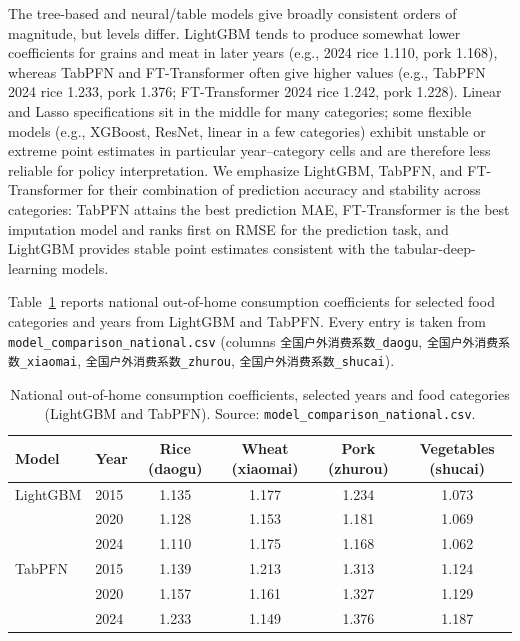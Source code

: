 The tree-based and neural/table models give broadly consistent orders of magnitude, but levels differ. LightGBM tends to produce somewhat lower coefficients for grains and meat in later years (e.g., 2024 rice 1.110, pork 1.168), whereas TabPFN and FT-Transformer often give higher values (e.g., TabPFN 2024 rice 1.233, pork 1.376; FT-Transformer 2024 rice 1.242, pork 1.228). Linear and Lasso specifications sit in the middle for many categories; some flexible models (e.g., XGBoost, ResNet, linear in a few categories) exhibit unstable or extreme point estimates in particular year--category cells and are therefore less reliable for policy interpretation. We emphasize LightGBM, TabPFN, and FT-Transformer for their combination of prediction accuracy and stability across categories: TabPFN attains the best prediction MAE, FT-Transformer is the best imputation model and ranks first on RMSE for the prediction task, and LightGBM provides stable point estimates consistent with the tabular-deep-learning models.

Table~\ref{tab:national_coef_summary} reports national out-of-home consumption coefficients for selected food categories and years from LightGBM and TabPFN. Every entry is taken from \texttt{model\_comparison\_national.csv} (columns \texttt{全国户外消费系数\_daogu}, \texttt{全国户外消费系数\_xiaomai}, \texttt{全国户外消费系数\_zhurou}, \texttt{全国户外消费系数\_shucai}).

\begin{table}[htbp]
\centering
\caption{National out-of-home consumption coefficients, selected years and food categories (LightGBM and TabPFN). Source: \texttt{model\_comparison\_national.csv}.}
\label{tab:national_coef_summary}
\begin{tabular}{llcccc}
\toprule
Model    & Year & Rice (daogu) & Wheat (xiaomai) & Pork (zhurou) & Vegetables (shucai) \\
\midrule
LightGBM & 2015 & 1.135 & 1.177 & 1.234 & 1.073 \\
         & 2020 & 1.128 & 1.153 & 1.181 & 1.069 \\
         & 2024 & 1.110 & 1.175 & 1.168 & 1.062 \\
\midrule
TabPFN   & 2015 & 1.139 & 1.213 & 1.313 & 1.124 \\
         & 2020 & 1.157 & 1.161 & 1.327 & 1.129 \\
         & 2024 & 1.233 & 1.149 & 1.376 & 1.187 \\
\bottomrule
\end{tabular}
\end{table}

